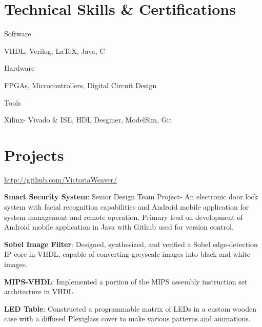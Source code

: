 \documentclass[a4paper,margin,line]{resume}
\begin{document}
\begin{resume}
\section{\mysidestyle Technical Skills \& Certifications}
    \begin{compactdesc}
        \item[Software] \begin{inparaenum} { \small
            VHDL,
            Verilog,
            \LaTeX,
            Java,
            C
        } \end{inparaenum}
        \item[Hardware] \begin{inparaenum} { \small
            FPGAs, 
            Microcontrollers, 
            Digital Circuit Design
       } \end{inparaenum}
        \item[Tools] \begin{inparaenum} { \small
            Xilinx- Vivado \& ISE,
            HDL Desginer,
            ModelSim,
            Git
        } \end{inparaenum}
    \end{compactdesc}

\section{\mysidestyle Projects}
    \begin{asparablank}
        \item \href{http://github.com/VictoriaWeaver/}{http://github.com/VictoriaWeaver/}\\
        \item \textbf{Smart Security System}: Senior Design Team Project- An electronic door lock system with facial recognition capabilities and Android mobile application for system management and remote operation.  Primary lead on development of Android mobile application in Java with Github used for version control.\\
        \item \textbf{Sobel Image Filter}: Designed, synthesized, and verified a Sobel edge-detection IP core in VHDL, capable of converting greyscale images into black and white images.\\
        \item \textbf{MIPS-VHDL}: Implemented a portion of the MIPS assembly instruction set architecture in VHDL.\\
        \item \textbf{LED Table}: Constructed a programmable matrix of LEDs in a custom wooden case with a diffused Plexiglass cover to make various patterns and animations.
    \end{asparablank}
    
\end{resume}
\end{document}
